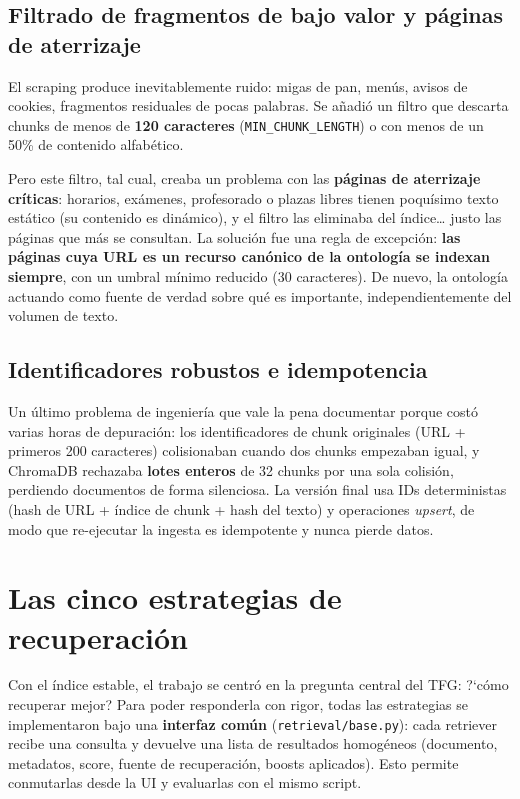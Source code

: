 \documentclass[12pt, a4paper, twoside]{report}
\begin{document}
\subsection{Filtrado de fragmentos de bajo valor y p\'aginas de aterrizaje}
\label{sec:filtering}

El scraping produce inevitablemente ruido: migas de pan, men\'us, avisos de cookies, fragmentos residuales de pocas palabras. Se a\~nadi\'o un filtro que descarta chunks de menos de \textbf{120 caracteres} (\texttt{MIN\_CHUNK\_LENGTH}) o con menos de un 50\% de contenido alfab\'etico.

Pero este filtro, tal cual, creaba un problema con las \textbf{p\'aginas de aterrizaje cr\'iticas}: horarios, ex\'amenes, profesorado o plazas libres tienen poqu\'isimo texto est\'atico (su contenido es din\'amico), y el filtro las eliminaba del \'indice\dots{} justo las p\'aginas que m\'as se consultan. La soluci\'on fue una regla de excepci\'on: \textbf{las p\'aginas cuya URL es un recurso can\'onico de la ontolog\'ia se indexan siempre}, con un umbral m\'inimo reducido (30 caracteres). De nuevo, la ontolog\'ia actuando como fuente de verdad sobre qu\'e es importante, independientemente del volumen de texto.

\subsection{Identificadores robustos e idempotencia}

Un \'ultimo problema de ingenier\'ia que vale la pena documentar porque cost\'o varias horas de depuraci\'on: los identificadores de chunk originales (URL + primeros 200 caracteres) colisionaban cuando dos chunks empezaban igual, y ChromaDB rechazaba \textbf{lotes enteros} de 32 chunks por una sola colisi\'on, perdiendo documentos de forma silenciosa. La versi\'on final usa IDs deterministas (hash de URL + \'indice de chunk + hash del texto) y operaciones \textit{upsert}, de modo que re-ejecutar la ingesta es idempotente y nunca pierde datos.

\section{Las cinco estrategias de recuperaci\'on}
\label{sec:estrategias}

Con el \'indice estable, el trabajo se centr\'o en la pregunta central del TFG: ?`c\'omo recuperar mejor? Para poder responderla con rigor, todas las estrategias se implementaron bajo una \textbf{interfaz com\'un} (\texttt{retrieval/base.py}): cada retriever recibe una consulta y devuelve una lista de resultados homog\'eneos (documento, metadatos, score, fuente de recuperaci\'on, boosts aplicados). Esto permite conmutarlas desde la UI y evaluarlas con el mismo script.
\end{document}
